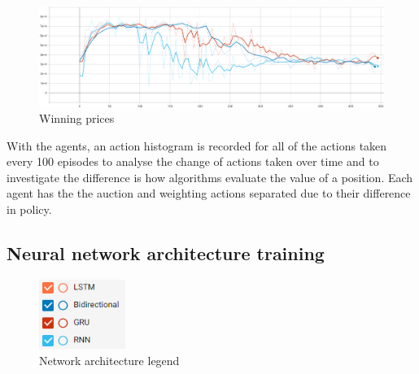 \begin{figure}[H]
    \centering
    \includegraphics[width=\linewidth]{figures/4_test_eval_figs/algo_training_fig/total_winning_prices.PNG}
    \caption{Winning prices}
    \label{fig:algo_winning_prices}
\end{figure}

With the agents, an action histogram is recorded for all of the actions taken every 100 episodes to analyse the change
of actions taken over time and to investigate the difference is how algorithms evaluate the value of a position. Each
agent has the the auction and weighting actions separated due to their difference in policy. \\



\subsection{Neural network architecture training}\label{subsec:neural-network-architecture-training}
\begin{figure}
    \includegraphics[width=0.25\textwidth]{figures/4_test_eval_figs/net_arch_training_fig/legend.png}
    \caption{Network architecture legend}
    \label{fig:net-arch-training-legend}
\end{figure}


